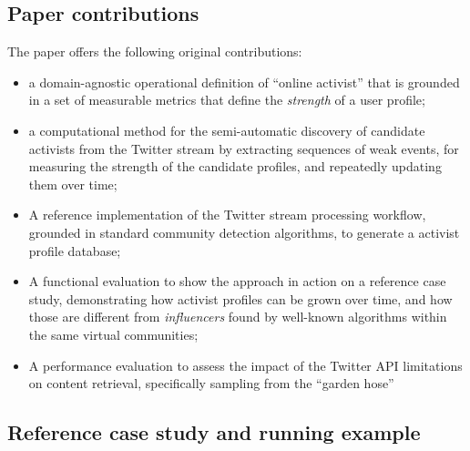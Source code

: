 \documentclass[runningheads]{llncs}
\begin{document}
\subsection{Paper contributions}

The paper offers the following original contributions:

\begin{itemize}
\item a domain-agnostic operational definition of ``online activist'' that is grounded in a set of measurable metrics that define the \textit{strength} of a user profile;

\item a computational method for the semi-automatic discovery of candidate activists from the Twitter stream by extracting sequences of weak events, for measuring the strength of the candidate profiles, and repeatedly updating them over time;

\item A reference implementation of the Twitter stream processing workflow, grounded in standard community detection algorithms, to generate a activist profile database;

\item A functional evaluation to show the approach in action on a reference case study, demonstrating how activist profiles can be grown over time, and how those are different from \textit{influencers} found by well-known algorithms within the same virtual communities;

\item A performance evaluation to assess the impact of the Twitter API limitations on content retrieval, specifically sampling from the ``garden hose'' 

\end{itemize}

\subsection{Reference case study and running example}

\end{document}
